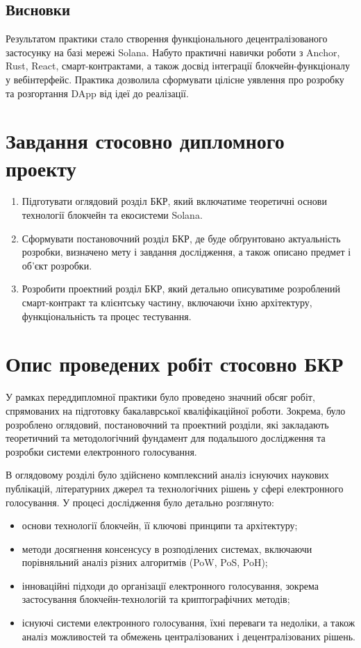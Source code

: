 \documentclass[14pt]{extreport}
\begin{document}
\subsection{Висновки}

Результатом практики стало створення функціонального децентралізованого застосунку на базі мережі Solana. Набуто практичні навички роботи з Anchor, Rust, React, смарт-контрактами, а також досвід інтеграції блокчейн-функціоналу у вебінтерфейс. Практика дозволила сформувати цілісне уявлення про розробку та розгортання DApp від ідеї до реалізації.


\section{Завдання стосовно дипломного проекту}

\begin{enumerate}
    \item Підготувати оглядовий розділ БКР, який включатиме теоретичні основи технології блокчейн та екосистеми Solana.
    \item Сформувати постановочний розділ БКР, де буде обґрунтовано актуальність розробки, визначено мету і завдання дослідження, а також описано предмет і об'єкт розробки.
    \item Розробити проектний розділ БКР, який детально описуватиме розроблений смарт-контракт та клієнтську частину, включаючи їхню архітектуру, функціональність та процес тестування.
\end{enumerate}

\section{Опис проведених робіт стосовно БКР}

У рамках переддипломної практики було проведено значний обсяг робіт, спрямованих на підготовку бакалаврської кваліфікаційної роботи. Зокрема, було розроблено оглядовий, постановочний та проектний розділи, які закладають теоретичний та методологічний фундамент для подальшого дослідження та розробки системи електронного голосування.

В оглядовому розділі було здійснено комплексний аналіз існуючих наукових публікацій, літературних джерел та технологічних рішень у сфері електронного голосування. У процесі дослідження було детально розглянуто:

\begin{itemize}
    \item основи технології блокчейн, її ключові принципи та архітектуру;
    \item методи досягнення консенсусу в розподілених системах, включаючи порівняльний аналіз різних алгоритмів (PoW, PoS, PoH);
    \item інноваційні підходи до організації електронного голосування, зокрема застосування блокчейн-технологій та криптографічних методів;
    \item існуючі системи електронного голосування, їхні переваги та недоліки, а також аналіз можливостей та обмежень централізованих і децентралізованих рішень.
\end{itemize}
\end{document}
